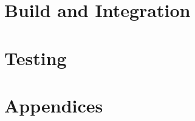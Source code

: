 \documentclass[11pt,a4paper]{report}
\theoremstyle{definitionstyle}
\begin{document}
\chapter{Build and Integration}

\chapter{Testing}


\newpage
\appendix
\chapter*{Appendices}
\end{document}
